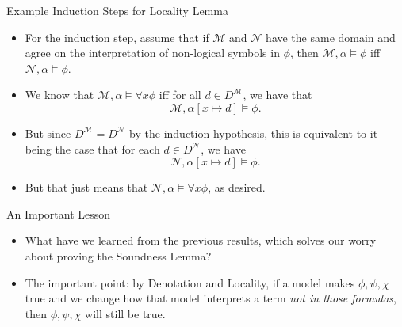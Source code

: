 \begin{frame}{Example Induction Steps for Locality Lemma}

  \begin{itemize}
  \itemsep=16pt
  
  \item For the induction step, assume that
    if $\mathcal{M}$ and 
    $\mathcal{N}$ have the same domain and agree on the
    interpretation of non-logical 
    symbols in $\phi$, then $\mathcal{M},\alpha\vDash \phi$ iff
    $\mathcal{N},\alpha\vDash\phi$.

  \item We know that $\mathcal{M},\alpha\vDash\forall x\phi$ iff for
    all $d\in D^\mathcal{M}$, we have that
    \[\mathcal{M},\alpha[x\mapsto d]\vDash\phi.\]

    \item But since $D^\mathcal{M}=D^\mathcal{N}$ by the induction
      hypothesis, this is equivalent to it being the case that  for each $d\in D^\mathcal{N}$, we
      have  \[\mathcal{N},\alpha[x\mapsto d]\vDash\phi.\]

      \item But that just means that $\mathcal{N},\alpha\vDash \forall
        x\phi$, as desired.
    
  \end{itemize}
  
\end{frame}

\begin{frame}{An Important Lesson}

	\begin{itemize}%
	\itemsep=16pt
		
	\item What have we learned from the previous results, which solves our worry about proving the Soundness Lemma?
	
	\item The important point: by Denotation and Locality, if a model makes $\phi,\psi,\chi$ true and we change how that model interprets a term \emph{not in those formulas}, then $\phi,\psi,\chi$ will still be true.
	
	\end{itemize} 

\end{frame}

